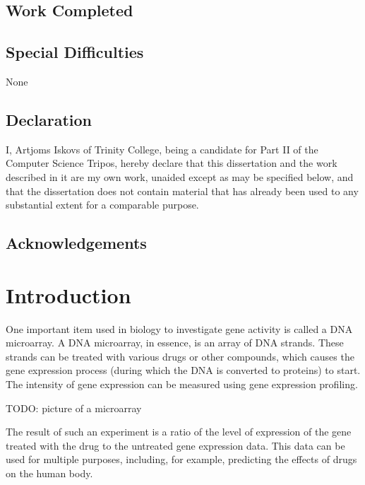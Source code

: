 \documentclass[12pt,a4paper,twoside,openright]{report}
\begin{document}
\section*{Work Completed}

\section*{Special Difficulties}
None
 
\newpage
\section*{Declaration}

I, Artjoms Iskovs of Trinity College, being a candidate for Part II of the Computer
Science Tripos, hereby declare that this dissertation and the work described in it are my own work,
unaided except as may be specified below, and that the dissertation does not contain material that has already been used to any substantial
extent for a comparable purpose.

\bigskip
{}

\medskip
{}

\tableofcontents

\listoffigures

\newpage
\section*{Acknowledgements}



\pagestyle{headings}

\chapter{Introduction}

One important item used in biology to investigate gene activity is called a DNA microarray. A DNA microarray, in essence, is an array of DNA strands. These strands can be treated with various drugs or other compounds, which causes the gene expression process (during which the DNA is converted to proteins) to start. The intensity of gene expression can be measured using gene expression profiling.

TODO: picture of a microarray

The result of such an experiment is a ratio of the level of expression of the gene treated with the drug to the untreated gene expression data. This data can be used for multiple purposes, including, for example, predicting the effects of drugs on the human body.
\end{document}
